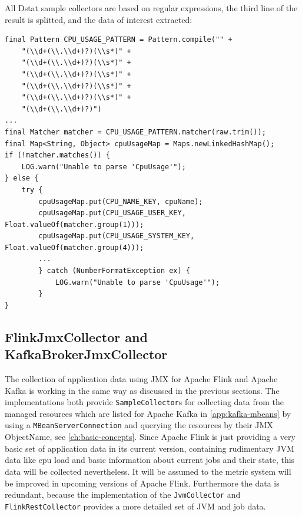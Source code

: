 All Dstat sample collectors are based on regular expressions, the third line of the result is splitted, and the data of interest
extracted:
\begin{lstlisting}[caption={"CpuSampleCollector", Extract sample data}, captionpos=b, label={lst:cpusamplecollector}]
final Pattern CPU_USAGE_PATTERN = Pattern.compile("" +
    "(\\d+(\\.\\d+)?)(\\s*)" +
    "(\\d+(\\.\\d+)?)(\\s*)" +
    "(\\d+(\\.\\d+)?)(\\s*)" +
    "(\\d+(\\.\\d+)?)(\\s*)" +
    "(\\d+(\\.\\d+)?)(\\s*)" +
    "(\\d+(\\.\\d+)?)")
...
final Matcher matcher = CPU_USAGE_PATTERN.matcher(raw.trim());
final Map<String, Object> cpuUsageMap = Maps.newLinkedHashMap();
if (!matcher.matches()) {
    LOG.warn("Unable to parse 'CpuUsage'");
} else {
    try {
        cpuUsageMap.put(CPU_NAME_KEY, cpuName);
        cpuUsageMap.put(CPU_USAGE_USER_KEY, Float.valueOf(matcher.group(1)));
        cpuUsageMap.put(CPU_USAGE_SYSTEM_KEY, Float.valueOf(matcher.group(4)));
        ...
        } catch (NumberFormatException ex) {
            LOG.warn("Unable to parse 'CpuUsage'");
        }
}
\end{lstlisting}

\subsection{FlinkJmxCollector and KafkaBrokerJmxCollector}

The collection of application data using JMX for Apache Flink and Apache Kafka is working in the
same way as discussed in the previous sections. The implementations both provide \verb|SampleCollector|s for collecting data
from the managed resources which are listed for Apache Kafka in \autoref{app:kafka-mbeans} by using a \verb|MBeanServerConnection| and querying the resources by their JMX ObjectName,
see \autoref{ch:basic-concepts}. Since Apache Flink is just providing a very basic set
of application data in its current version, containing rudimentary JVM data like cpu load and basic information about current
jobs and their state, this data will be collected nevertheless. It will be assumed to the metric system will be improved in upcoming versions
of Apache Flink. Furthermore the data is redundant, because the implementation of the \verb|JvmCollector| and \verb|FlinkRestCollector| provides a
more detailed set of JVM and job data.

